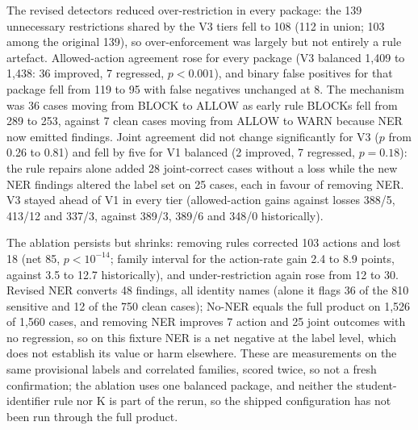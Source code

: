 \documentclass[sigconf]{acmart}
\theoremstyle{acmdefinition}\newtheorem{property}{Property}
\begin{document}
The revised detectors reduced over-restriction in every package: the 139 unnecessary restrictions shared by the V3 tiers fell to 108 (112 in union; 103 among the original 139), so over-enforcement was largely but not entirely a rule artefact. Allowed-action agreement rose for every package (V3 balanced 1,409 to 1,438: 36 improved, 7 regressed, $p<0.001$), and binary false positives for that package fell from 119 to 95 with false negatives unchanged at 8. The mechanism was 36 cases moving from BLOCK to ALLOW as early rule BLOCKs fell from 289 to 253, against 7 clean cases moving from ALLOW to WARN because NER now emitted findings. Joint agreement did not change significantly for V3 ($p$ from 0.26 to 0.81) and fell by five for V1 balanced (2 improved, 7 regressed, $p=0.18$): the rule repairs alone added 28 joint-correct cases without a loss while the new NER findings altered the label set on 25 cases, each in favour of removing NER. V3 stayed ahead of V1 in every tier (allowed-action gains against losses 388/5, 413/12 and 337/3, against 389/3, 389/6 and 348/0 historically).

The ablation persists but shrinks: removing rules corrected 103 actions and lost 18 (net 85, $p<10^{-14}$; family interval for the action-rate gain 2.4 to 8.9 points, against 3.5 to 12.7 historically), and under-restriction again rose from 12 to 30. Revised NER converts 48 findings, all identity names (alone it flags 36 of the 810 sensitive and 12 of the 750 clean cases); No-NER equals the full product on 1,526 of 1,560 cases, and removing NER improves 7 action and 25 joint outcomes with no regression, so on this fixture NER is a net negative at the label level, which does not establish its value or harm elsewhere. These are measurements on the same provisional labels and correlated families, scored twice, so not a fresh confirmation; the ablation uses one balanced package, and neither the student-identifier rule nor K is part of the rerun, so the shipped configuration has not been run through the full product.
\end{document}
